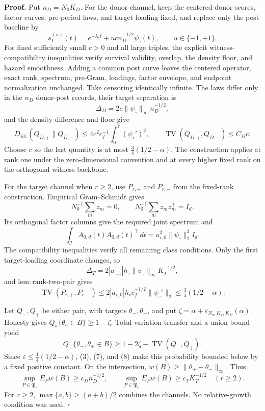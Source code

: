\textbf{Proof.}
Put \(n_D=N_0K_D\). For the donor channel, keep the centered donor scores, factor curves, pre-period laws, and target loading fixed, and replace only the post baseline by
\[
 s_1^{(u)}(t)=e^{-\lambda_\circ t}+u c n_D^{-1/2}\psi_\circ(t),
 \qquad u\in\{-1,+1\}.                                  \tag{1}
\]
For fixed sufficiently small \(c>0\) and all large triples, the explicit witness-compatibility inequalities verify survival validity, overlap, the density floor, and hazard smoothness. Adding a common post curve leaves the centered operator, exact rank, spectrum, pre-Gram, loadings, factor envelope, and endpoint normalization unchanged. Take censoring identically infinite. The laws differ only in the \(n_D\) donor-post records, their target separation is
\[
 \Delta_D=2c\|\psi_\circ\|_\infty n_D^{-1/2},          \tag{2}
\]
and the density difference and floor give
\[
 D_{\mathrm{KL}}(Q_{D,+}\|Q_{D,-})
 \le4c^2c_f^{-1}\int_0^{\bar\tau}(\psi_\circ')^2,
 \qquad \operatorname{TV}(Q_{D,+},Q_{D,-})\le C_Dc.     \tag{3}
\]
Choose \(c\) so the last quantity is at most \(\tfrac34(1/2-\alpha)\). The construction applies at rank one under the zero-dimensional convention and at every higher fixed rank on the orthogonal witness backbone.

For the target channel when \(r\ge2\), use \(P_{r,+}\) and \(P_{r,-}\) from the fixed-rank construction. Empirical Gram--Schmidt gives
\[
 N_0^{-1}\sum_mz_m=0,
 \qquad N_0^{-1}\sum_mz_mz_m^\top=I_d.                  \tag{4}
\]
Its orthogonal factor columns give the required joint spectrum and
\[
 \int_{\mathcal I}A_{0,d}(t)A_{0,d}(t)^\top\,dt
 =a_{\circ,0}^2\|\psi_\circ\|_2^2I_d.                  \tag{5}
\]
The compatibility inequalities verify all remaining class conditions. Only the first target-loading coordinate changes, so
\[
 \Delta_T=2|a_{\circ,1}|h_\circ\|\psi_\circ\|_\infty K_T^{-1/2}, \tag{6}
\]
and \(\mathrm{lem:rank\mbox{-}two\mbox{-}pair}\) gives
\[
 \operatorname{TV}(P_{r,+},P_{r,-})
 \le2|a_{\circ,0}|h_\circ c_f^{-1/2}\|\psi_\circ'\|_2
 \le\tfrac34(1/2-\alpha).                               \tag{7}
\]

Let \(Q_-,Q_+\) be either pair, with targets \(\theta_-,\theta_+\), and put \(\zeta=\alpha+\varepsilon_{N_0,K_T,K_D}(\alpha)\). Honesty gives \(Q_u\{\theta_u\in B\}\ge1-\zeta\). Total-variation transfer and a union bound yield
\[
 Q_-\{\theta_-,\theta_+\in B\}
 \ge1-2\zeta-\operatorname{TV}(Q_-,Q_+).                 \tag{8}
\]
Since \(\varepsilon\le\tfrac14(1/2-\alpha)\), (3), (7), and (8) make this probability bounded below by a fixed positive constant. On the intersection, \(w(B)\ge\|\theta_+-\theta_-\|_\infty\). Thus
\[
 \sup_{P\in\mathfrak P_r}E_Pw(B)\ge c_Dn_D^{-1/2},
 \qquad
 \sup_{P\in\mathfrak P_r}E_Pw(B)\ge c_TK_T^{-1/2}\quad(r\ge2). \tag{9}
\]
For \(r\ge2\), \(\max\{a,b\}\ge(a+b)/2\) combines the channels. No relative-growth condition was used. \(\square\)